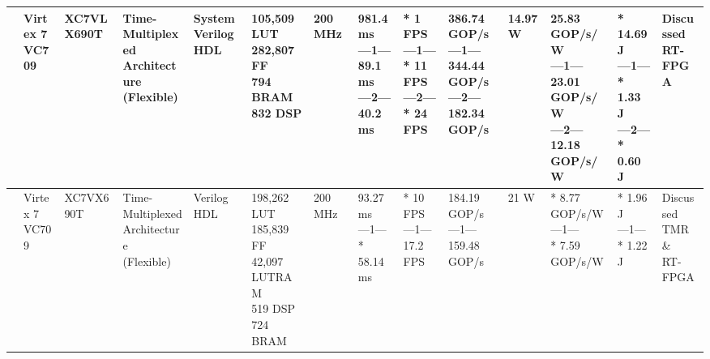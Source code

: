 \begin{center}
{\begin{tabular}{llllllllllllll}
\cite{niAlgorithmHardwareCoOptimizationDeployment2023} & \makecell[tl]{Virtex 7\\ VC709} & XC7VLX690T & \makecell[tl]{Time-Multiplexed\\ Architecture\\ (Flexible)} & \makecell[tl]{SystemVerilog\\ HDL} & \makecell[tl]{105,509 LUT\\ 282,807 FF\\ 794 BRAM\\ 832 DSP} & 200 MHz & \makecell[tl]{981.4 ms\\ ---1---\\ 89.1 ms\\ ---2---\\ 40.2 ms} & \makecell[tl]{* 1 FPS\\ ---1---\\ * 11 FPS\\ ---2---\\ * 24 FPS} & \makecell[tl]{386.74 GOP/s\\ ---1---\\ 344.44 GOP/s\\ ---2---\\ 182.34 GOP/s} & 14.97 W & \makecell[tl]{25.83 GOP/s/W\\ ---1---\\ 23.01 GOP/s/W\\ ---2---\\ 12.18 GOP/s/W} & \makecell[tl]{* 14.69 J\\ ---1---\\ * 1.33 J\\ ---2---\\ * 0.60 J} & \makecell[tl]{Discussed\\ RT-FPGA} \\ \hline
\cite{guoOverlayAcceleratorDeepLab2024} & \makecell[tl]{Virtex 7\\ VC709} & XC7VX690T & \makecell[tl]{Time-Multiplexed\\ Architecture\\ (Flexible)} & \makecell[tl]{Verilog\\ HDL} & \makecell[tl]{198,262 LUT\\ 185,839 FF\\ 42,097 LUTRAM\\ 519 DSP\\ 724 BRAM} & 200 MHz & \makecell[tl]{93.27 ms\\ ---1---\\ * 58.14 ms} & \makecell[tl]{* 10 FPS\\ ---1---\\ 17.2 FPS} & \makecell[tl]{184.19 GOP/s\\ ---1---\\ 159.48 GOP/s} & 21 W & \makecell[tl]{* 8.77 GOP/s/W\\ ---1---\\ * 7.59 GOP/s/W} & \makecell[tl]{* 1.96 J\\ ---1---\\ * 1.22 J} & \makecell[tl]{Discussed\\ TMR \& \\RT-FPGA} \\ \hline

\end{tabular}}
\end{center}
